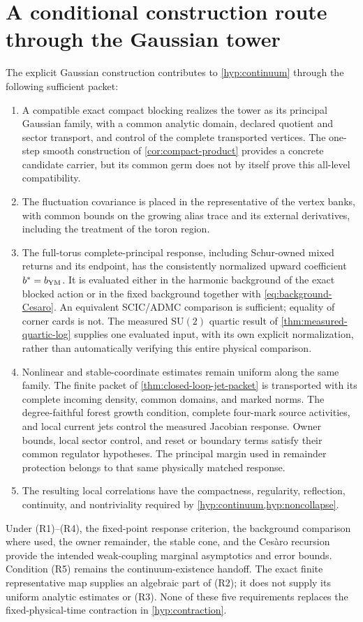 \documentclass[11pt,oneside,openany]{book}
\theoremstyle{definition}
\theoremstyle{remark}
\newcommand{\SU}{\mathrm{SU}}
\begin{document}
\section{A conditional construction route through the Gaussian tower}
The explicit Gaussian construction contributes to
\cref{hyp:continuum} through the following sufficient packet:
\begin{enumerate}[label=\textup{(R\arabic*)},leftmargin=3em]
\item A compatible exact compact blocking realizes the tower as its
principal Gaussian family, with a common analytic domain, declared
quotient and sector transport, and control of the complete transported
vertices. The one-step smooth construction of \cref{cor:compact-product}
provides a concrete candidate carrier, but its common germ does not by
itself prove this all-level compatibility.
\item The fluctuation covariance is placed in the representative of the
vertex banks, with common bounds on the growing alias trace and its
external derivatives, including the treatment of the toron region.
\item The full-torus complete-principal response, including Schur-owned
mixed returns and its endpoint, has the consistently normalized upward
coefficient $b^*=b_{\rm YM}$. It is evaluated either in
the harmonic background of the exact blocked action or in the fixed
background together with \cref{eq:background-Cesaro}. An equivalent
SCIC/ADMC comparison is sufficient; equality of corner cards is not.
The measured $\SU(2)$ quartic result of
\cref{thm:measured-quartic-log} supplies one evaluated input, with its
own explicit normalization, rather than automatically verifying this
entire physical comparison.
\item Nonlinear and stable-coordinate estimates remain uniform along the
same family. The finite packet of
\cref{thm:closed-loop-jet-packet} is transported with its complete
incoming density, common domains, and marked norms. The degree-faithful
forest growth condition, complete four-mark source activities, and
local current jets control the measured Jacobian response. Owner bounds, local sector control, and reset or
boundary terms satisfy their common regulator hypotheses. The principal margin used in remainder protection
belongs to that same physically matched response.
\item The resulting local correlations have the compactness, regularity,
reflection, continuity, and nontriviality required by
\cref{hyp:continuum,hyp:noncollapse}.
\end{enumerate}
Under (R1)--(R4), the fixed-point response criterion, the background
comparison where used, the owner remainder, the stable cone, and the
Ces\`aro recursion provide the intended weak-coupling marginal asymptotics
and error bounds. Condition (R5) remains the continuum-existence handoff.
The exact finite representative map supplies an algebraic part of (R2);
it does not supply its uniform analytic estimates or (R3). None of these
five requirements replaces the fixed-physical-time contraction in
\cref{hyp:contraction}.
\end{document}
